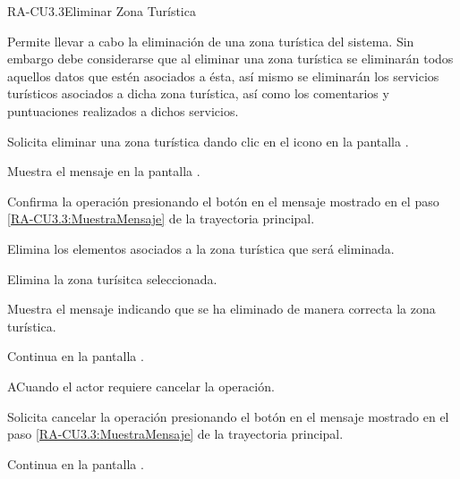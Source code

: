 	\begin{UseCase}{RA-CU3.3}{Eliminar Zona Turística}{
		
		Permite llevar a cabo la eliminación de una zona turística del sistema. Sin embargo debe considerarse que al eliminar una zona turística se eliminarán todos aquellos datos que estén asociados a ésta, así mismo se eliminarán los servicios turísticos asociados a dicha zona turística, así como los comentarios y puntuaciones realizados a dichos servicios.
	}
	\end{UseCase}
	\begin{UCtrayectoria} 
		\UCpaso [\UCactor] Solicita eliminar una zona turística dando clic en el icono \IUEliminar{} en la pantalla .
		
		\UCpaso \label{RA-CU3.3:MuestraMensaje} Muestra el mensaje  en la pantalla .
		
		\UCpaso [\UCactor] Confirma la operación presionando el botón  en el mensaje mostrado en el paso \ref{RA-CU3.3:MuestraMensaje} de la trayectoria principal. 
		
		\UCpaso Elimina los elementos asociados a la zona turística que será eliminada. 
		
		\UCpaso Elimina la zona turísitca seleccionada. 
		
		\UCpaso Muestra el mensaje  indicando que se ha eliminado de manera correcta la zona turística.
		
		\UCpaso Continua en la pantalla .
		
	\end{UCtrayectoria}

	\begin{UCtrayectoriaA}{A}{Cuando el actor requiere cancelar la operación.}
		
		\UCpaso [\UCactor] Solicita cancelar la operación presionando el botón  en el mensaje mostrado en el paso \ref{RA-CU3.3:MuestraMensaje} de la trayectoria principal.
		
		\UCpaso Continua en la pantalla .
	\end{UCtrayectoriaA}